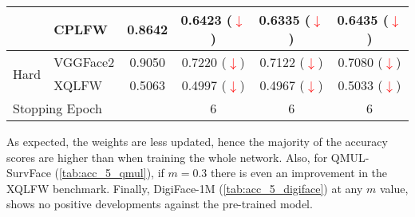 \documentclass[class=report, crop=false, a4paper, 12pt]{standalone}
\begin{document}
\begin{table}[H]
{\begin{tabular}{clcccc}
    \multicolumn{1}{|c|}{}                         & \multicolumn{1}{l|}{CPLFW}    & \multicolumn{1}{c|}{0.8642}   & \multicolumn{1}{c|}{0.6423 (\textcolor{red}{$\downarrow$})} & \multicolumn{1}{c|}{0.6335 (\textcolor{red}{$\downarrow$})} & \multicolumn{1}{c|}{0.6435 (\textcolor{red}{$\downarrow$})} \\ \hline
    \multicolumn{1}{|c|}{\multirow{2}{*}{Hard}}    & \multicolumn{1}{l|}{VGGFace2} & \multicolumn{1}{c|}{0.9050}   & \multicolumn{1}{c|}{0.7220 (\textcolor{red}{$\downarrow$})} & \multicolumn{1}{c|}{0.7122 (\textcolor{red}{$\downarrow$})} & \multicolumn{1}{c|}{0.7080 (\textcolor{red}{$\downarrow$})} \\ \cline{2-6} 
    \multicolumn{1}{|c|}{}                         & \multicolumn{1}{l|}{XQLFW}    & \multicolumn{1}{c|}{0.5063}   & \multicolumn{1}{c|}{0.4997 (\textcolor{red}{$\downarrow$})} & \multicolumn{1}{c|}{0.4967 (\textcolor{red}{$\downarrow$})} & \multicolumn{1}{c|}{0.5033 (\textcolor{red}{$\downarrow$})} \\ \hline
    \multicolumn{3}{|l|}{Stopping Epoch}                                                                           & \multicolumn{1}{c|}{6}           & \multicolumn{1}{c|}{6}           & \multicolumn{1}{c|}{6}           \\ \hline
    \end{tabular}%
    }
\end{table}

As expected, the weights are less updated, hence the majority of the accuracy scores are higher than when training the whole network. Also, for QMUL-SurvFace (\autoref{tab:acc_5_qmul}), if $m=0.3$ there is even an improvement in the XQLFW benchmark. Finally, DigiFace-1M (\autoref{tab:acc_5_digiface}) at any $m$ value, shows no positive developments against the pre-trained model.
\end{document}
